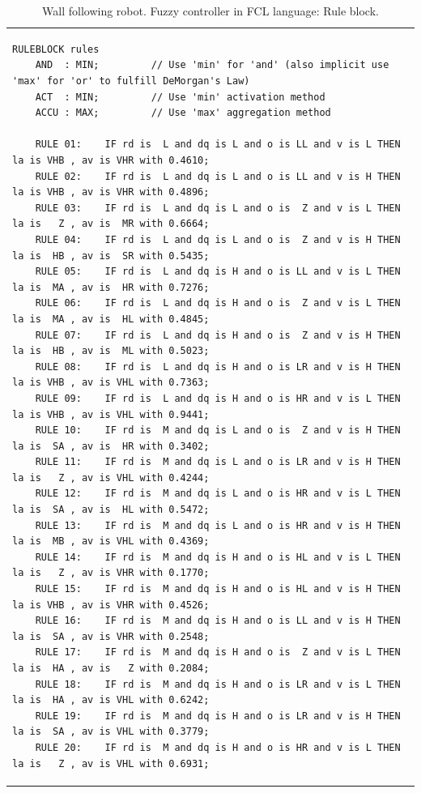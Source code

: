 \documentclass[conference]{IEEEtran}
\begin{document}
\begin{table}[!t]
\renewcommand{\arraystretch}{1.3}
\caption{Wall following robot. Fuzzy controller in FCL language: Rule block.}
\label{t:robotRules}
\centering
\begin{tabular}{|l|}
\hline
\begin{lstlisting}
RULEBLOCK rules
	AND  : MIN;			// Use 'min' for 'and' (also implicit use 'max' for 'or' to fulfill DeMorgan's Law)
	ACT  : MIN;			// Use 'min' activation method
	ACCU : MAX;			// Use 'max' aggregation method

    RULE 01:    IF rd is  L and dq is L and o is LL and v is L THEN la is VHB , av is VHR with 0.4610;
    RULE 02:    IF rd is  L and dq is L and o is LL and v is H THEN la is VHB , av is VHR with 0.4896;
    RULE 03:    IF rd is  L and dq is L and o is  Z and v is L THEN la is   Z , av is  MR with 0.6664;
    RULE 04:    IF rd is  L and dq is L and o is  Z and v is H THEN la is  HB , av is  SR with 0.5435;
    RULE 05:    IF rd is  L and dq is H and o is LL and v is L THEN la is  MA , av is  HR with 0.7276;
    RULE 06:    IF rd is  L and dq is H and o is  Z and v is L THEN la is  MA , av is  HL with 0.4845;
    RULE 07:    IF rd is  L and dq is H and o is  Z and v is H THEN la is  HB , av is  ML with 0.5023;
    RULE 08:    IF rd is  L and dq is H and o is LR and v is H THEN la is VHB , av is VHL with 0.7363;
    RULE 09:    IF rd is  L and dq is H and o is HR and v is L THEN la is VHB , av is VHL with 0.9441;
    RULE 10:    IF rd is  M and dq is L and o is  Z and v is H THEN la is  SA , av is  HR with 0.3402;
    RULE 11:    IF rd is  M and dq is L and o is LR and v is H THEN la is   Z , av is VHL with 0.4244;
    RULE 12:    IF rd is  M and dq is L and o is HR and v is L THEN la is  SA , av is  HL with 0.5472;
    RULE 13:    IF rd is  M and dq is L and o is HR and v is H THEN la is  MB , av is VHL with 0.4369;
    RULE 14:    IF rd is  M and dq is H and o is HL and v is L THEN la is   Z , av is VHR with 0.1770;
    RULE 15:    IF rd is  M and dq is H and o is HL and v is H THEN la is VHB , av is VHR with 0.4526;
    RULE 16:    IF rd is  M and dq is H and o is LL and v is H THEN la is  SA , av is VHR with 0.2548;
    RULE 17:    IF rd is  M and dq is H and o is  Z and v is L THEN la is  HA , av is   Z with 0.2084;
    RULE 18:    IF rd is  M and dq is H and o is LR and v is L THEN la is  HA , av is VHL with 0.6242;
    RULE 19:    IF rd is  M and dq is H and o is LR and v is H THEN la is  SA , av is VHL with 0.3779;
    RULE 20:    IF rd is  M and dq is H and o is HR and v is L THEN la is   Z , av is VHL with 0.6931;

\end{lstlisting}
\end{tabular}
\end{table}
\end{document}
